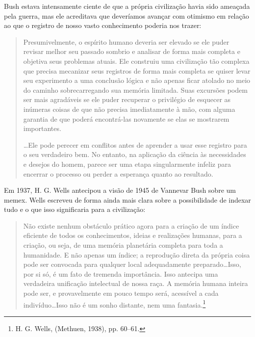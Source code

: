 Bush estava intensamente ciente de que a própria civilização havia sido ameaçada pela guerra,
mas ele acreditava que deveríamos avançar com otimismo em relação ao que o registro de nosso
vasto conhecimento poderia nos trazer:

\begin{quote}
    Presumivelmente, o espírito humano deveria ser elevado se ele puder revisar melhor seu
    passado sombrio e analisar de forma mais completa e objetiva seus problemas atuais. Ele
    construiu uma civilização tão complexa que precisa mecanizar seus registros de forma mais
    completa se quiser levar seu experimento a uma conclusão lógica e não apenas ficar atolado
    no meio do caminho sobrecarregando sua memória limitada. Suas excursões podem ser mais
    agradáveis se ele puder recuperar o privilégio de esquecer as inúmeras coisas de que não
    precisa imediatamente à mão, com alguma garantia de que poderá encontrá-las novamente se
    elas se mostrarem importantes.
    
    \ldots Ele pode perecer em conflitos antes de aprender a usar esse registro para o seu
    verdadeiro bem. No entanto, na aplicação da ciência às necessidades e desejos do homem,
    parece ser uma etapa singularmente infeliz para encerrar o processo ou perder a esperança
    quanto ao resultado.
\end{quote}

\begin{tcolorbox}[title={Um Precedente Futurista}]
    Em 1937, H. G. Wells antecipou a visão de 1945 de Vannevar Bush sobre um memex. Wells
    escreveu de forma ainda mais clara sobre a possibilidade de indexar tudo e o que isso
    significaria para a civilização:
    
    \begin{quote}
        Não existe nenhum obstáculo prático agora para a criação de um índice eficiente de
        todos os conhecimentos, ideias e realizações humanas, para a criação, ou seja, de uma
        memória planetária completa para toda a humanidade. E não apenas um índice; a
        reprodução direta da própria coisa pode ser convocada para qualquer local adequadamente
        preparado\ldots Isso, por si só, é um fato de tremenda importância. Isso antecipa uma
        verdadeira unificação intelectual de nossa raça. A memória humana inteira pode ser, e
        provavelmente em pouco tempo será, acessível a cada indivíduo\ldots Isso não é um sonho
        distante, nem uma fantasia.\footnote{H. G. Wells,  (Methuen, 1938),
        pp. 60–61.}
    \end{quote}
\end{tcolorbox}


